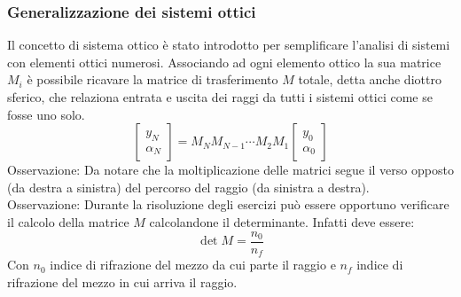 \documentclass{article}
\begin{document}
\subsubsection*{Generalizzazione dei sistemi ottici}
Il concetto di sistema ottico è stato introdotto per semplificare l'analisi di sistemi con elementi ottici numerosi. Associando ad ogni elemento ottico la sua matrice $M_i$ è possibile ricavare la matrice di trasferimento $M$ totale, detta anche diottro sferico, che relaziona entrata e uscita dei raggi da tutti i sistemi ottici come se fosse uno solo.
\[
\begin{bmatrix}
y_N\\
\alpha_N
\end{bmatrix}
=
M_N M_{N-1} \cdots M_2 M_1
\begin{bmatrix}
y_0\\
\alpha_0
\end{bmatrix}
\]
Osservazione:
Da notare che la moltiplicazione delle matrici segue il verso opposto (da destra a sinistra) del percorso del raggio (da sinistra a destra).\\
Osservazione:
Durante la risoluzione degli esercizi può essere opportuno verificare il calcolo della matrice $M$ calcolandone il determinante. Infatti deve essere:
\begin{equation*}
\det M = \frac{n_0}{n_f}
\end{equation*}
Con $n_0$ indice di rifrazione del mezzo da cui parte il raggio e $n_f$ indice di rifrazione del mezzo in cui arriva il raggio.
\end{document}

